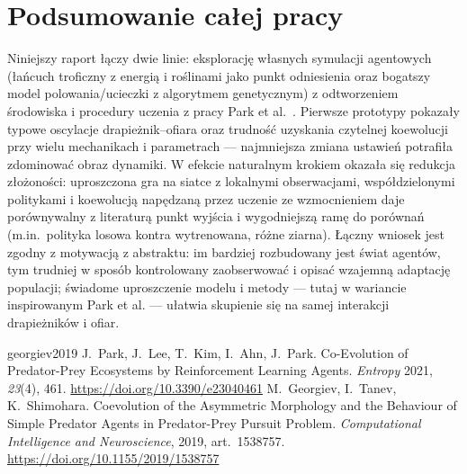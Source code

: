 \documentclass[polish]{template/projectreport}
\begin{document}
\section{Podsumowanie całej pracy}
\label{sec:podsumowanie}
Niniejszy raport łączy dwie linie: eksplorację własnych symulacji agentowych (łańcuch troficzny z energią i roślinami jako punkt odniesienia oraz bogatszy model polowania/ucieczki z algorytmem genetycznym) z odtworzeniem środowiska i procedury uczenia z pracy Park et al.~\cite{park2021}.
Pierwsze prototypy pokazały typowe oscylacje drapieżnik--ofiara oraz trudność uzyskania czytelnej koewolucji przy wielu mechanikach i parametrach --- najmniejsza zmiana ustawień potrafiła zdominować obraz dynamiki.
W efekcie naturalnym krokiem okazała się redukcja złożoności: uproszczona gra na siatce z lokalnymi obserwacjami, współdzielonymi politykami i koewolucją napędzaną przez uczenie ze wzmocnieniem daje porównywalny z literaturą punkt wyjścia i wygodniejszą ramę do porównań (m.in.\ polityka losowa kontra wytrenowana, różne ziarna).
Łączny wniosek jest zgodny z motywacją z abstraktu: im bardziej rozbudowany jest świat agentów, tym trudniej w sposób kontrolowany zaobserwować i opisać wzajemną adaptację populacji; świadome uproszczenie modelu i metody --- tutaj w wariancie inspirowanym Park et al. --- ułatwia skupienie się na samej interakcji drapieżników i ofiar.


\begin{thebibliography}{georgiev2019}
J.~Park, J.~Lee, T.~Kim, I.~Ahn, J.~Park.
\newblock Co-Evolution of Predator-Prey Ecosystems by Reinforcement Learning Agents.
\newblock \emph{Entropy} 2021, \emph{23}(4), 461.
\newblock \url{https://doi.org/10.3390/e23040461}
M.~Georgiev, I.~Tanev, K.~Shimohara.
\newblock Coevolution of the Asymmetric Morphology and the Behaviour of Simple Predator Agents in Predator-Prey Pursuit Problem.
\newblock \emph{Computational Intelligence and Neuroscience}, 2019, art.\ 1538757.
\newblock \url{https://doi.org/10.1155/2019/1538757}
\end{thebibliography}
\end{document}
